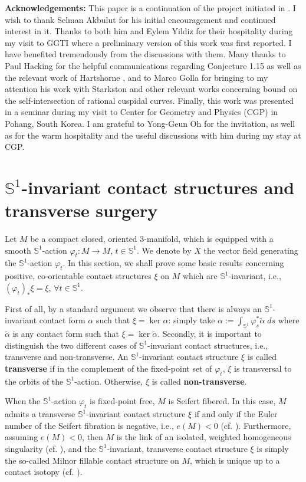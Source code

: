 \documentclass[11pt]{amsart}
\theoremstyle{plain}
\numberwithin{theorem}{section}
\theoremstyle{definition}
\newcommand{\s}{{\mathbb S}}
\begin{document}
{\bf Acknowledgements:} This paper is a continuation of the project initiated in \cite{C}. I wish to thank Selman Akbulut for his initial encouragement and continued interest in it. Thanks to both him and Eylem Yildiz for their hospitality during my visit to GGTI where a preliminary version of this work was first reported. I have benefited tremendously from the discussions with them. Many thanks to Paul Hacking for the helpful communications regarding Conjecture 1.15 as well as the relevant work of Hartshorne \cite{Hartsh}, and to Marco Golla for bringing to my attention his work with Starkston \cite{GS2} and other relevant works concerning bound on the self-intersection of rational cuspidal curves. Finally, this work was presented in a seminar during my visit to Center for Geometry and Physics (CGP) in Pohang, South Korea. I am grateful to Yong-Geun Oh for the invitation, as well as for the warm hospitality and the useful discussions with him during my stay at CGP. 

\section{$\s^1$-invariant contact structures and transverse surgery}

Let $M$ be a compact closed, oriented $3$-manifold, which is equipped with a smooth
$\s^1$-action $\varphi_t: M\rightarrow M$, $t\in\s^1$. We denote by $X$ the vector field 
generating the $\s^1$-action $\varphi_t$. In this section, we shall prove some basic results 
concerning positive, co-orientable contact structures $\xi$ on $M$ which are $\s^1$-invariant, 
i.e., $(\varphi_t)_\ast \xi=\xi$, $\forall t\in\s^1$. 

First of all, by a standard argument we observe that there is always an $\s^1$-invariant
contact form $\alpha$ such that $\xi=\ker \alpha$: simply take $\alpha:=\int_{\s^1} \varphi_s^\ast 
\tilde{\alpha} \; ds$ where $\tilde{\alpha}$ is any contact form such that $\xi=\ker\tilde{\alpha}$. 
Secondly, it is important to distinguish the two different cases of $\s^1$-invariant contact structures, 
i.e., transverse and non-transverse. An $\s^1$-invariant contact structure $\xi$ is called {\bf transverse} if in the complement of the fixed-point set of $\varphi_t$, $\xi$ is transversal to the orbits of the $\s^1$-action. Otherwise, $\xi$ is called {\bf non-transverse}.

When the $\s^1$-action $\varphi_t$ is fixed-point free, $M$ is Seifert fibered. In this case, $M$ admits
a transverse $\s^1$-invariant contact structure $\xi$ if and only if the Euler number of the Seifert fibration is negative, i.e., $e(M)<0$ (cf. \cite{PM}). Furthermore, assuming $e(M)<0$, then $M$ is the link of an isolated, weighted homogeneous singularity (cf. \cite{NR}), and the $\s^1$-invariant, transverse contact structure $\xi$ is simply the so-called Milnor fillable contact structure on $M$, which is unique up to a contact isotopy (cf. \cite{CNP}). 
\end{document}
